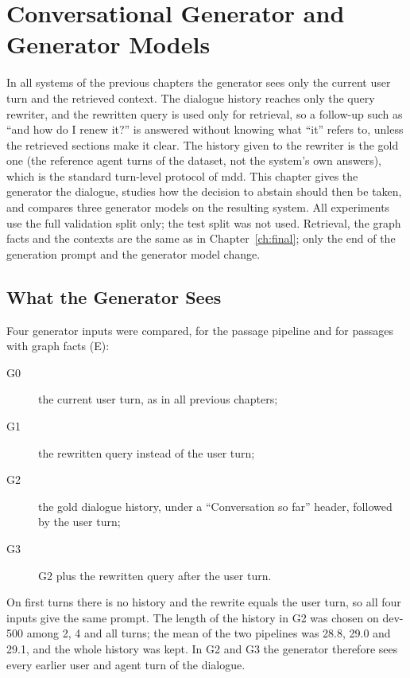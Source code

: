 
\chapter{Conversational Generator and Generator Models}\label{ch:convgen}

In all systems of the previous chapters the generator sees only the current user turn
and the retrieved context. The dialogue history reaches only the query rewriter, and the
rewritten query is used only for retrieval, so a follow-up such as ``and how do I renew
it?'' is answered without knowing what ``it'' refers to, unless the retrieved sections
make it clear. The history given to the rewriter is the gold one (the reference agent
turns of the dataset, not the system's own answers), which is the standard turn-level
protocol of \gls{mdd}. This chapter gives the generator the dialogue, studies how the
decision to abstain should then be taken, and compares three generator models on the
resulting system. All experiments use the full validation split only; the test split was
not used. Retrieval, the graph facts and the contexts are the same as in
Chapter~\ref{ch:final}; only the end of the generation prompt and the generator model
change.


\section{What the Generator Sees}\label{sec:convgen:input}

Four generator inputs were compared, for the passage pipeline and for passages with graph
facts (E):
\begin{description}
    \item[G0] the current user turn, as in all previous chapters;
    \item[G1] the rewritten query instead of the user turn;
    \item[G2] the gold dialogue history, under a ``Conversation so far'' header, followed by
        the user turn;
    \item[G3] G2 plus the rewritten query after the user turn.
\end{description}
On first turns there is no history and the rewrite equals the user turn, so all four
inputs give the same prompt. The length of the history in G2 was chosen on dev-500 among
2, 4 and all turns; the mean \fone{} of the two pipelines was 28.8, 29.0 and 29.1, and the
whole history was kept. In G2 and G3 the generator therefore sees every earlier user and
agent turn of the dialogue.

